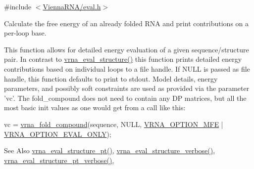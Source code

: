 {\ttfamily \#include $<$\hyperlink{eval_8h}{Vienna\-R\-N\-A/eval.\-h}$>$}



Calculate the free energy of an already folded R\-N\-A and print contributions on a per-\/loop base. 

This function allows for detailed energy evaluation of a given sequence/structure pair. In contrast to \hyperlink{group__eval_ga58f199f1438d794a265f3b27fc8ea631}{vrna\-\_\-eval\-\_\-structure()} this function prints detailed energy contributions based on individual loops to a file handle. If N\-U\-L\-L is passed as file handle, this function defaults to print to stdout. Model details, energy parameters, and possibly soft constraints are used as provided via the parameter 'vc'. The fold\-\_\-compound does not need to contain any D\-P matrices, but all the most basic init values as one would get from a call like this\-: 
\begin{DoxyCode}
vc = \hyperlink{group__fold__compound_ga6601d994ba32b11511b36f68b08403be}{vrna\_fold\_compound}(sequence, NULL, \hyperlink{group__fold__compound_gae63be9127fe7dcc1f9bb14f5bb1064ee}{VRNA\_OPTION\_MFE} | 
      \hyperlink{group__fold__compound_ga61469c423131552c8483229f8b6c7e0e}{VRNA\_OPTION\_EVAL\_ONLY});
\end{DoxyCode}


\begin{DoxySeeAlso}{See Also}
\hyperlink{group__eval_gadbd09372ddfd7a450bbd590c96a6bfe4}{vrna\-\_\-eval\-\_\-structure\-\_\-pt()}, \hyperlink{group__eval_ga0928d699d310178f84ee2351034e5cb5}{vrna\-\_\-eval\-\_\-structure\-\_\-verbose()}, \hyperlink{group__eval_ga8a517cfeeae8c376ae7b1e0c401d38b4}{vrna\-\_\-eval\-\_\-structure\-\_\-pt\-\_\-verbose()},
\end{DoxySeeAlso}

